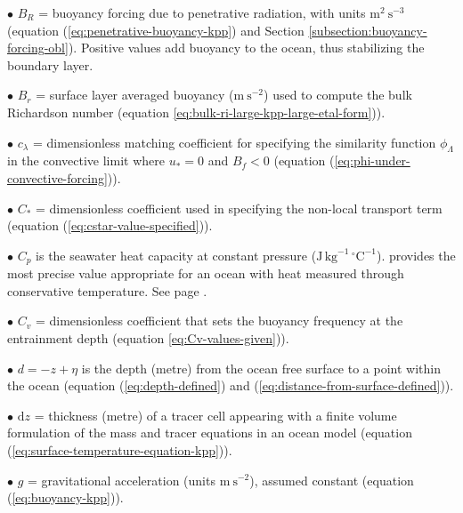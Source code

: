 \begin{mdframed}[backgroundcolor=lightgray!50]
\begin{trivlist}
\item[$\bullet$] $B_{R}$ = buoyancy forcing due to penetrative
  radiation, with units $\mbox{m}^{2}~\mbox{s}^{-3}$ (equation
  (\ref{eq:penetrative-buoyancy-kpp}) and Section
  \ref{subsection:buoyancy-forcing-obl}).  Positive values add
  buoyancy to the ocean, thus stabilizing the boundary layer.

\item[$\bullet$] $B_{r}$ = surface layer averaged buoyancy
  ($\mbox{m}~\mbox{s}^{-2}$) used to compute the bulk Richardson
  number (equation \ref{eq:bulk-ri-large-kpp-large-etal-form})).

\item[$\bullet$] $c_{\lambda}$ = dimensionless matching coefficient
  for specifying the similarity function $\phi_{\Lambda}$ in the
  convective limit where $u_{*} = 0$ and $B_{f} < 0$ (equation
  (\ref{eq:phi-under-convective-forcing})).

\item[$\bullet$] $C_{*}$ = dimensionless coefficient used in
  specifying the non-local transport term (equation
  (\ref{eq:cstar-value-specified})).

\item[$\bullet$] $C_{p}$ is the seawater heat capacity at constant
  pressure ($\mbox{J} \, \mbox{kg}^{-1} \,
  \mbox{}^{\circ}\mbox{C}^{-1}$).  \cite{TEOS2010} provides the most
  precise value appropriate for an ocean with heat measured through
  conservative temperature.  See page \pageref{heat_capacity}.

\item[$\bullet$] $C_{v}$ = dimensionless coefficient that sets the
  buoyancy frequency at the entrainment depth (equation
  \ref{eq:Cv-values-given})).

\item[$\bullet$] $d = -z + \eta$ is the depth (metre) from the ocean free surface
  to a point within the ocean (equation (\ref{eq:depth-defined}) and
  (\ref{eq:distance-from-surface-defined})).

\item[$\bullet$] $\mathrm{d}z$ = thickness (metre) of a tracer cell
  appearing with a finite volume formulation of the mass and tracer
  equations in an ocean model (equation
  (\ref{eq:surface-temperature-equation-kpp})).

\item[$\bullet$] $g$ = gravitational acceleration (units
  $\mbox{m}~\mbox{s}^{-2}$), assumed constant (equation
  (\ref{eq:buoyancy-kpp})).


\end{trivlist}
\end{mdframed}
